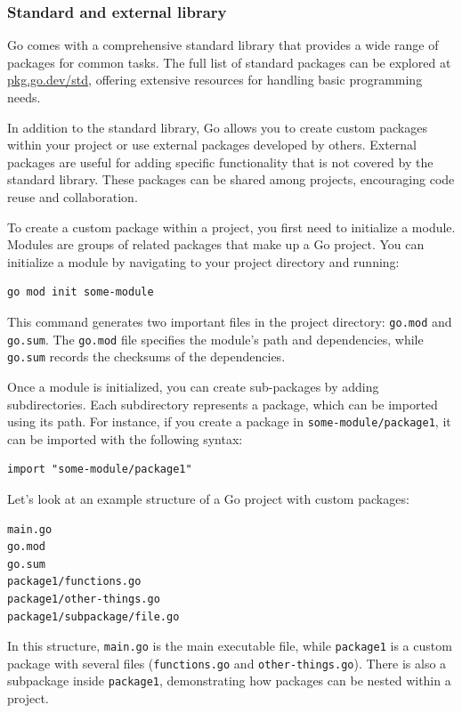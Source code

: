 \subsubsection{Standard and external library}
Go comes with a comprehensive standard library that provides a wide range of packages for common tasks. The full list of standard packages can be explored at \href{https://pkg.go.dev/std}{pkg.go.dev/std}, offering extensive resources for handling basic programming needs.

In addition to the standard library, Go allows you to create custom packages within your project or use external packages developed by others. External packages are useful for adding specific functionality that is not covered by the standard library. These packages can be shared among projects, encouraging code reuse and collaboration.

To create a custom package within a project, you first need to initialize a module. Modules are groups of related packages that make up a Go project. You can initialize a module by navigating to your project directory and running:

\begin{verbatim}
go mod init some-module
\end{verbatim}
This command generates two important files in the project directory: \texttt{go.mod} and \texttt{go.sum}. The \texttt{go.mod} file specifies the module’s path and dependencies, while \texttt{go.sum} records the checksums of the dependencies.

Once a module is initialized, you can create sub-packages by adding subdirectories. Each subdirectory represents a package, which can be imported using its path. For instance, if you create a package in \texttt{some-module/package1}, it can be imported with the following syntax:

\begin{verbatim}
import "some-module/package1"
\end{verbatim}
Let’s look at an example structure of a Go project with custom packages:

\begin{verbatim}
main.go
go.mod
go.sum
package1/functions.go
package1/other-things.go
package1/subpackage/file.go
\end{verbatim}
In this structure, \texttt{main.go} is the main executable file, while \texttt{package1} is a custom package with several files (\texttt{functions.go} and \texttt{other-things.go}). There is also a subpackage inside \texttt{package1}, demonstrating how packages can be nested within a project.

